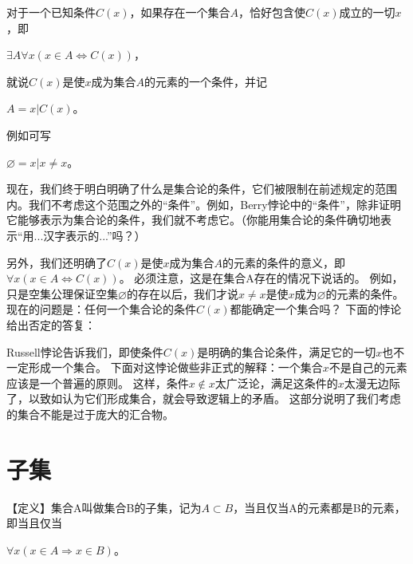 对于一个已知条件$C(x)$，如果存在一个集合$A$，恰好包含使$C(x)$成立的一切$x$，即
\begin{center}
$\exists A \forall x (x \in A \Leftrightarrow C(x))$，
\end{center}
就说$C(x)$是使$x$成为集合$A$的元素的一个条件，并记
\begin{center}
$A={x|C(x)}$。
\end{center}

例如可写
\begin{center}
$\varnothing={x|x \neq x}$。
\end{center}

现在，我们终于明白明确了什么是集合论的条件，它们被限制在前述规定的范围内。我们不考虑这个范围之外的“条件”。例如，Berry悖论中的“条件”，除非证明它能够表示为集合论的条件，我们就不考虑它。（你能用集合论的条件确切地表示“用...汉字表示的...”吗？）

另外，我们还明确了$C(x)$是使$x$成为集合$A$的元素的条件的意义，即$\forall x (x \in A \Leftrightarrow C(x))$。
必须注意，这是在集合A存在的情况下说话的。
例如，只是空集公理保证空集$\varnothing$的存在以后，我们才说$x \neq x$是使$x$成为$\varnothing$的元素的条件。
现在的问题是：任何一个集合论的条件$C(x)$都能确定一个集合吗？
下面的悖论给出否定的答复：


Russell悖论告诉我们，即使条件$C(x)$是明确的集合论条件，满足它的一切$x$也不一定形成一个集合。
下面对这悖论做些非正式的解释：一个集合$x$不是自己的元素应该是一个普遍的原则。
这样，条件$x \notin x$太广泛论，满足这条件的$x$太漫无边际了，以致如认为它们形成集合，就会导致逻辑上的矛盾。
这部分说明了我们考虑的集合不能是过于庞大的汇合物。

\section{子集}

【定义】集合A叫做集合B的子集，记为$A \subset B$，当且仅当A的元素都是B的元素，即当且仅当
\begin{center}
$\forall x (x \in A \Rightarrow x \in B)$。
\end{center}

